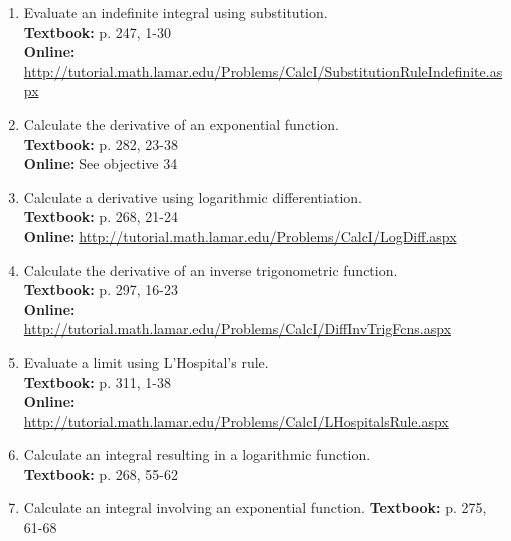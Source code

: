 \documentclass[12pt,landscape]{article}
\begin{document}
\begin{multicols}{2}
\begin{enumerate}
\item Evaluate an indefinite integral using substitution.\\
\textbf{Textbook:} p. 247, 1-30\\
\textbf{Online:} \url{http://tutorial.math.lamar.edu/Problems/CalcI/SubstitutionRuleIndefinite.aspx}
\item Calculate the derivative of an exponential function.\\
\textbf{Textbook:} p. 282, 23-38\\
\textbf{Online:} See objective 34
\item Calculate a derivative using logarithmic differentiation.\\
\textbf{Textbook:} p. 268, 21-24\\
\textbf{Online:} \url{http://tutorial.math.lamar.edu/Problems/CalcI/LogDiff.aspx}
\item Calculate the derivative of an inverse trigonometric function.\\
\textbf{Textbook:} p. 297, 16-23\\
\textbf{Online:} \url{http://tutorial.math.lamar.edu/Problems/CalcI/DiffInvTrigFcns.aspx}
\item Evaluate a limit using L'Hospital's rule.\\
\textbf{Textbook:} p. 311, 1-38\\
\textbf{Online:} \url{http://tutorial.math.lamar.edu/Problems/CalcI/LHospitalsRule.aspx}
\item Calculate an integral resulting in a logarithmic function.\\
\textbf{Textbook:} p. 268, 55-62\\
\item Calculate an integral involving an exponential function.
\textbf{Textbook:} p. 275, 61-68\\
\end{enumerate}
\end{multicols}
\end{document}
